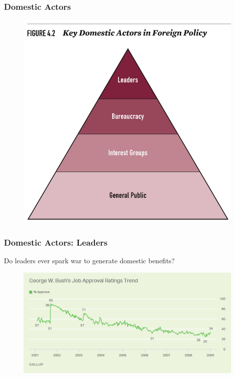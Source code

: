 \documentclass{beamer}
\begin{document}
\begin{frame} 
	\frametitle{\LARGE{Domestic Actors}}
	\begin{figure}[ht!]
		\centering
		\includegraphics[width=\textwidth,height=0.9\textheight,keepaspectratio]{Domesticactors.jpg}
	\end{figure}
\end{frame}

\begin{frame} 
	\frametitle{\LARGE{Domestic Actors: Leaders}}
 Do leaders ever spark war to generate domestic benefits?
	\begin{figure}[ht!]
	\centering
	\includegraphics[width=\textwidth,height=0.9\textheight,keepaspectratio]{Bushapproval.png}
	\end{figure}
\end{frame}
\end{document}
